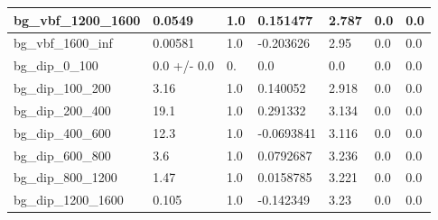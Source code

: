 \documentclass[a4paper, 10pt]{article}
\begin{document}
\begin{table}[H]
\begin{center}
\begin{tabular}{|m{23.0mm}|m{23.0mm}|m{18.0mm}|m{19.0mm}|m{19.0mm}|m{19.0mm}|m{19.0mm}|}
      \hline
      {\cellcolor{white}         bg\_vbf\_1200\_1600}& {\cellcolor{white}         0.0549}& {\cellcolor{white}         1.0}& {\cellcolor{white}         0.151477}& {\cellcolor{white}         2.787}& {\cellcolor{green}         0.0}& {\cellcolor{green}         0.0}\\
      \hline
      {\cellcolor{white}         bg\_vbf\_1600\_inf}& {\cellcolor{white}         0.00581}& {\cellcolor{white}         1.0}& {\cellcolor{white}         -0.203626}& {\cellcolor{white}         2.95}& {\cellcolor{green}         0.0}& {\cellcolor{green}         0.0}\\
      \hline
      {\cellcolor{white}         bg\_dip\_0\_100}& {\cellcolor{white}         0.0 +/\-- 0.0}& {\cellcolor{white}         0.}& {\cellcolor{white}         0.0}& {\cellcolor{white}         0.0}& {\cellcolor{green}         0.0}& {\cellcolor{green}         0.0}\\
      \hline
      {\cellcolor{white}         bg\_dip\_100\_200}& {\cellcolor{white}         3.16}& {\cellcolor{white}         1.0}& {\cellcolor{white}         0.140052}& {\cellcolor{white}         2.918}& {\cellcolor{green}         0.0}& {\cellcolor{green}         0.0}\\
      \hline
      {\cellcolor{white}         bg\_dip\_200\_400}& {\cellcolor{white}         19.1}& {\cellcolor{white}         1.0}& {\cellcolor{white}         0.291332}& {\cellcolor{white}         3.134}& {\cellcolor{green}         0.0}& {\cellcolor{green}         0.0}\\
      \hline
      {\cellcolor{white}         bg\_dip\_400\_600}& {\cellcolor{white}         12.3}& {\cellcolor{white}         1.0}& {\cellcolor{white}         -0.0693841}& {\cellcolor{white}         3.116}& {\cellcolor{green}         0.0}& {\cellcolor{green}         0.0}\\
      \hline
      {\cellcolor{white}         bg\_dip\_600\_800}& {\cellcolor{white}         3.6}& {\cellcolor{white}         1.0}& {\cellcolor{white}         0.0792687}& {\cellcolor{white}         3.236}& {\cellcolor{green}         0.0}& {\cellcolor{green}         0.0}\\
      \hline
      {\cellcolor{white}         bg\_dip\_800\_1200}& {\cellcolor{white}         1.47}& {\cellcolor{white}         1.0}& {\cellcolor{white}         0.0158785}& {\cellcolor{white}         3.221}& {\cellcolor{green}         0.0}& {\cellcolor{green}         0.0}\\
      \hline
      {\cellcolor{white}         bg\_dip\_1200\_1600}& {\cellcolor{white}         0.105}& {\cellcolor{white}         1.0}& {\cellcolor{white}         -0.142349}& {\cellcolor{white}         3.23}& {\cellcolor{green}         0.0}& {\cellcolor{green}         0.0}\\

\end{tabular}
\end{center}
\end{table}
\end{document}
